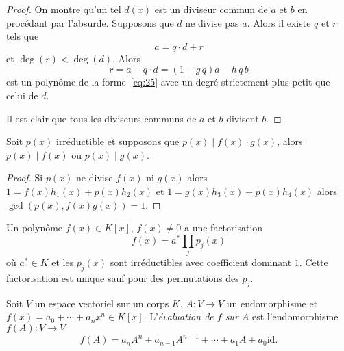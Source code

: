 \begin{proof}
  On montre qu'un tel $d(x)$ est un diviseur commun de $a$ et $b$ en procédant par l'absurde. Supposons que $d$ ne divise pas $a$. Alors il existe $q$ et $r$ tels que 
  \begin{displaymath}
    a = q\cdot d +r 
  \end{displaymath}
et $\deg(r) < \deg(d)$. Alors 
\begin{displaymath}
  r = a - q\cdot d = (1 - g\,q) a - h\,q\,b
\end{displaymath}
est un polynôme de la forme~\eqref{eq:25} avec un degré strictement plus petit que celui de $d$. 

Il est clair que tous les diviseurs communs de $a$ et $b$ divisent $b$. 
\end{proof}




\begin{theorem}
  \label{thr:39}
  Soit $p(x)$ irréductible et supposons que $p(x) \mid f(x) \cdot  g(x)$, alors $p(x)\mid f(x)$ ou $p(x) \mid g(x)$. 
\end{theorem}

\begin{proof}
Si $p(x)$ ne divise $f(x)$ ni $g(x)$ alors $1 = f(x) h_1(x) + p(x)h_2(x)$ et 
$1 = g(x) h_3(x) + p(x) h_4(x)$ alors $\gcd(p(x), f(x)g(x))=1$. 
\end{proof}


\begin{theorem}
  \label{thr:40}
  Un polynôme  $f(x) \in K[x]$, $f(x) ≠ 0$  a une factorisation 
  \begin{displaymath}
    f(x) = a^* \prod_j p_j(x)
  \end{displaymath}
  où $a^* \in K$ et les $p_j(x)$ sont irréductibles avec coefficient dominant $1$. Cette factorisation est unique sauf pour des permutations des $p_j$. 
\end{theorem}





\begin{definition}
  \label{def:34}
  Soit $V$ un espace vectoriel sur un corps $K$, $A: V \rightarrow V$ un endomorphisme et $f(x) = a_0+ \cdots + a_n x^n\in K[x]$. L'\emph{évaluation de $f$ sur $A$} est l'endomorphisme $f(A): V \rightarrow V$ 
  \begin{displaymath}
    f(A) = a_n A^n + a_{n-1}A^{n-1}+ \cdots + a_1 A + a_0 \mathrm{id}. 
  \end{displaymath}
\end{definition}



